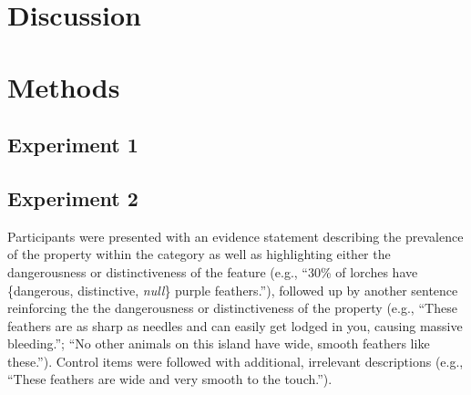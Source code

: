 \documentclass[floatsintext, 11pt, doc]{apa6}
\begin{document}
\section{Discussion}

\section{Methods}

\subsection{Experiment 1}

\subsection{Experiment 2}

Participants were presented with an evidence statement describing the prevalence of the property within the category as well as highlighting either the dangerousness or distinctiveness of the feature (e.g., ``30\% of lorches have \{dangerous, distinctive, \emph{null}\} purple feathers.''), followed up by another sentence reinforcing the the dangerousness or distinctiveness of the property (e.g., ``These feathers are as sharp as needles and can easily get lodged in you, causing massive bleeding.''; ``No other animals on this island have wide, smooth feathers like these.''). Control items were followed with additional, irrelevant descriptions (e.g., ``These feathers are wide and very smooth to the touch.''). 

\end{document}

